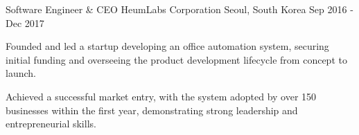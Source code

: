 \begin{cventries}
\cventry
{Software Engineer \& CEO} %
{HeumLabs Corporation} %
{Seoul, South Korea} %
{Sep 2016 - Dec 2017} %
{ %
\begin{cvitems}
    \item Founded and led a startup developing an office automation system, securing initial funding and overseeing the product development lifecycle from concept to launch.
    \item Achieved a successful market entry, with the system adopted by over 150 businesses within the first year, demonstrating strong leadership and entrepreneurial skills.
\end{cvitems}
}




\end{cventries}
